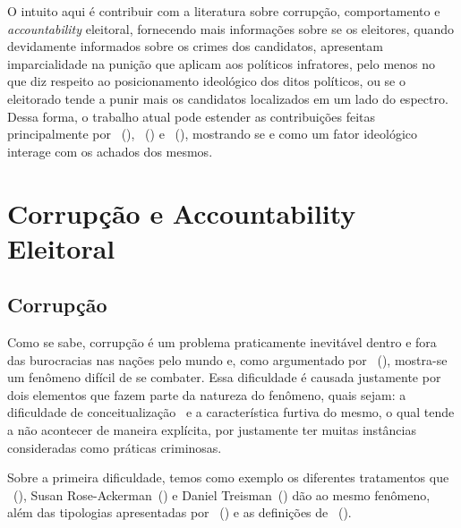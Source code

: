 \documentclass[
	12pt,				%
	openright,			%
	twoside,			%
	a4paper,			%
	openany,
	english,			%
	brazil				%
	]{abntex2}
\begin{document}
O intuito aqui é contribuir com a literatura sobre corrupção, comportamento e \textit{accountability} eleitoral, fornecendo mais informações sobre se os eleitores, quando devidamente informados sobre os crimes dos candidatos, apresentam imparcialidade na punição que aplicam aos políticos infratores, pelo menos no que diz respeito ao posicionamento ideológico dos ditos políticos, ou se o eleitorado tende a punir mais os candidatos localizados em um lado do espectro. Dessa forma, o trabalho atual pode estender as contribuições feitas principalmente por ~(\citeyear{ferraz2008exposing}), ~(\citeyear{Boas2019Apr}) e ~(\citeyear{Botero2021Apr}), mostrando se e como um fator ideológico interage com os achados dos mesmos.

\chapter{Corrupção e Accountability Eleitoral}

\section{Corrupção}

Como se sabe, corrupção é um problema praticamente inevitável dentro e fora das burocracias nas nações pelo mundo e, como argumentado por ~(\citeyear{Treisman2000Jun}), mostra-se um fenômeno difícil de se combater. Essa dificuldade é causada justamente por dois elementos que fazem parte da natureza do fenômeno, quais sejam: a dificuldade de conceitualização~\cite{bussell2015typologies} e a característica furtiva do mesmo, o qual tende a não acontecer de maneira explícita\cite{Treisman2000Jun, gehrke2018eleiccoes}, por justamente ter muitas instâncias consideradas como práticas criminosas.

Sobre a primeira dificuldade, temos como exemplo os diferentes tratamentos que ~(\citeyear{ferraz2008exposing}), Susan Rose-Ackerman~(\citeyear{Rose-Ackerman1996Sep}) e Daniel Treisman~(\citeyear{Treisman2000Jun}) dão ao mesmo fenômeno, além das tipologias apresentadas por ~(\citeyear{bussell2015typologies}) e as definições de ~(\citeyear{sep-corruption}).
\end{document}
